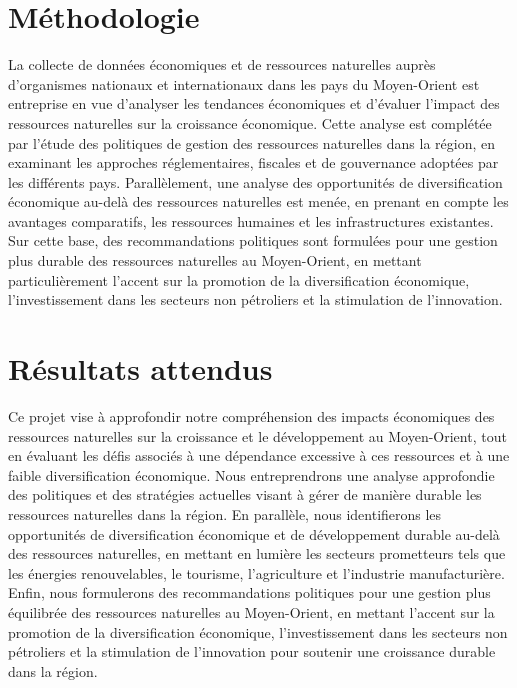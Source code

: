 \documentclass[a4paper, 12pt]{report}
\begin{document}
\section*{Méthodologie}

La collecte de données économiques et de ressources naturelles auprès d'organismes nationaux et internationaux dans les pays du Moyen-Orient est entreprise en vue d'analyser les tendances économiques et d'évaluer l'impact des ressources naturelles sur la croissance économique. Cette analyse est complétée par l'étude des politiques de gestion des ressources naturelles dans la région, en examinant les approches réglementaires, fiscales et de gouvernance adoptées par les différents pays. Parallèlement, une analyse des opportunités de diversification économique au-delà des ressources naturelles est menée, en prenant en compte les avantages comparatifs, les ressources humaines et les infrastructures existantes. Sur cette base, des recommandations politiques sont formulées pour une gestion plus durable des ressources naturelles au Moyen-Orient, en mettant particulièrement l'accent sur la promotion de la diversification économique, l'investissement dans les secteurs non pétroliers et la stimulation de l'innovation.

\section*{Résultats attendus}

Ce projet vise à approfondir notre compréhension des impacts économiques des ressources naturelles sur la croissance et le développement au Moyen-Orient, tout en évaluant les défis associés à une dépendance excessive à ces ressources et à une faible diversification économique. Nous entreprendrons une analyse approfondie des politiques et des stratégies actuelles visant à gérer de manière durable les ressources naturelles dans la région. En parallèle, nous identifierons les opportunités de diversification économique et de développement durable au-delà des ressources naturelles, en mettant en lumière les secteurs prometteurs tels que les énergies renouvelables, le tourisme, l'agriculture et l'industrie manufacturière. Enfin, nous formulerons des recommandations politiques pour une gestion plus équilibrée des ressources naturelles au Moyen-Orient, en mettant l'accent sur la promotion de la diversification économique, l'investissement dans les secteurs non pétroliers et la stimulation de l'innovation pour soutenir une croissance durable dans la région.
\end{document}
